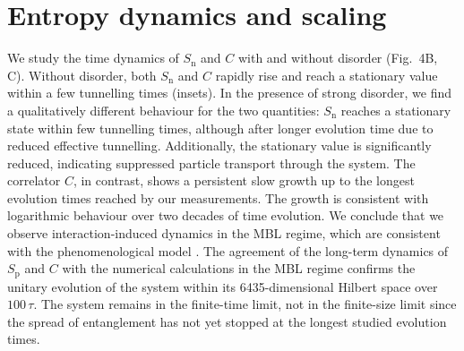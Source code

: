 \section{Entropy dynamics and scaling}

We study the time dynamics of $S_\text{n}$ and $C$ with and without disorder (Fig.~4B, C). Without disorder, both $S_\text{n}$ and $C$ rapidly rise and reach a stationary value within a few tunnelling times (insets). In the presence of strong disorder, we find a qualitatively different behaviour for the two quantities: $S_\text{n}$ reaches a stationary state within few tunnelling times, although after longer evolution time due to reduced effective tunnelling. Additionally, the stationary value is significantly reduced, indicating suppressed particle transport through the system. The correlator $C$, in contrast, shows a persistent slow growth up to the longest evolution times reached by our measurements. The growth is consistent with logarithmic behaviour over two decades of time evolution. We conclude that we observe interaction-induced dynamics in the MBL regime, which are consistent with the phenomenological model \cite{Serbyn2013, Serbyn2013b, Huse2014}. The agreement of the long-term dynamics of $S_\text{p}$ and $C$ with the numerical calculations in the MBL regime confirms the unitary evolution of the system within its 6435-dimensional Hilbert space over $100\,\tau$. The system remains in the finite-time limit, not in the finite-size limit since the spread of entanglement has not yet stopped at the longest studied evolution times. 

